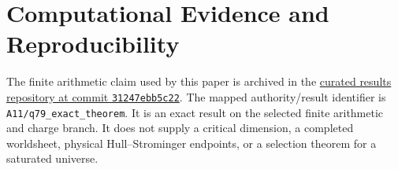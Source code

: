 \documentclass[11pt]{article}
\begin{document}
\section*{Computational Evidence and Reproducibility}
The finite arithmetic claim used by this paper is archived in the
\href{https://github.com/PeterNero/mtt-results-repro/tree/31247ebb5c22f3fbb5443024365433c6ee0bff4a}
{curated results repository at commit \texttt{31247ebb5c22}}.
The mapped authority/result identifier is
\nolinkurl{A11/q79_exact_theorem}.  It is an exact result on the selected
finite arithmetic and charge branch.  It does not supply a critical
dimension, a completed worldsheet, physical Hull--Strominger endpoints, or a
selection theorem for a saturated universe.
\end{document}
